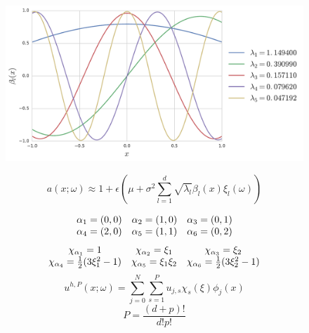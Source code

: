\documentclass{beamer}
\begin{document}
\begin{frame}
    \begin{figure}
        \centering
        \includegraphics[width=0.75\linewidth]{img/kle-eigenfunctions.pdf}
    \end{figure}
    \pause
    \[
        a(x;\omega) \approx 1 + \epsilon\left(\mu
            + \sigma^2\sum_{l=1}^d\sqrt{\lambda_l}\beta_l(x)\xi_l(\omega)\right)
    \]
\end{frame}

\begin{frame}
    \[
        \begin{array}{c c c}
            \alpha_1 = (0,0) & \alpha_2 = (1,0) & \alpha_3 = (0,1) \\
            \alpha_4 = (2,0) & \alpha_5 = (1,1) & \alpha_6 = (0,2)
        \end{array}
    \]
    \pause
    \[
        \begin{array}{c c c}
            \chi_{\alpha_1} = 1 & \chi_{\alpha_2} = \xi_1 & \chi_{\alpha_3} = \xi_2 \\
            \chi_{\alpha_4} = \frac{1}{2}(3\xi_1^2 - 1) &
            \chi_{\alpha_5} = \xi_1\xi_2 &
            \chi_{\alpha_6} = \frac{1}{2}(3\xi_2^2 - 1)
        \end{array}
    \]
    \pause
    \[
        u^{h,P}(x;\omega) = \sum_{j=0}^N\sum_{s=1}^Pu_{j,s}\chi_s(\xi)\phi_j(x)
    \]
    \[
        P = \frac{(d+p)!}{d!p!}
    \]
\end{frame}
\end{document}
